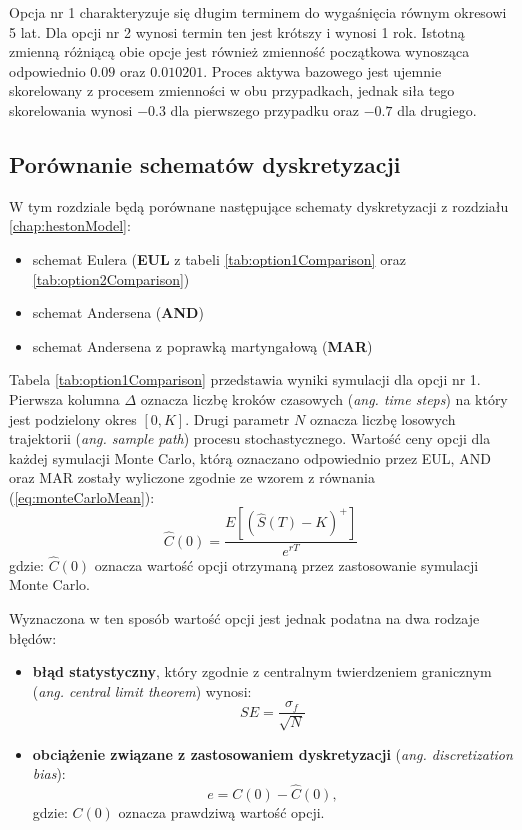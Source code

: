 \documentclass{pracamgr}
\begin{document}
Opcja nr 1 charakteryzuje się długim terminem do wygaśnięcia równym okresowi 5 lat. Dla opcji
nr 2 wynosi termin ten jest krótszy i wynosi 1 rok. Istotną 
zmienną różniącą obie opcje jest również zmienność początkowa 
wynosząca odpowiednio $0.09$ oraz $0.010201$. Proces aktywa bazowego jest ujemnie skorelowany
z procesem zmienności w obu przypadkach, jednak siła tego skorelowania wynosi $-0.3$ dla 
pierwszego przypadku oraz $-0.7$ dla drugiego.

\subsection{Porównanie schematów dyskretyzacji}
\label{sub:simulationNumericResult}
W tym rozdziale będą porównane następujące schematy dyskretyzacji z rozdziału \ref{chap:hestonModel}:
\begin{itemize}
  \item schemat Eulera (\textbf{EUL} z tabeli \ref{tab:option1Comparison} oraz \ref{tab:option2Comparison})
  \item schemat Andersena (\textbf{AND})
  \item schemat Andersena z poprawką martyngałową (\textbf{MAR})
\end{itemize}
Tabela \ref{tab:option1Comparison} przedstawia wyniki symulacji 
dla opcji nr 1. Pierwsza kolumna $\Delta$ oznacza
liczbę kroków czasowych (\textit{ang. time steps}) na który 
jest podzielony okres $[0, K]$. Drugi parametr $N$ oznacza liczbę
losowych trajektorii (\textit{ang. sample path}) procesu stochastycznego. 
Wartość ceny opcji dla każdej symulacji Monte Carlo, 
którą oznaczano odpowiednio przez EUL, AND oraz MAR 
zostały wyliczone zgodnie ze wzorem z równania (\ref{eq:monteCarloMean}):
\begin{equation}
  \hat{C}(0) = \frac{E \left[ (\hat{S}(T) - K)^{+} \right]}{e^{rT}}
\end{equation}
gdzie: $\hat{C}(0)$ oznacza wartość opcji otrzymaną przez zastosowanie symulacji Monte Carlo.

Wyznaczona w ten sposób wartość opcji jest jednak podatna na dwa rodzaje błędów:
\begin{itemize}
  \item \textbf{błąd statystyczny}, który zgodnie z centralnym twierdzeniem granicznym 
    (\textit{ang. central limit theorem}) wynosi:
  \begin{equation}
    SE = \frac{\sigma_f}{\sqrt{N}}
  \end{equation}

  \item \textbf{obciążenie związane z zastosowaniem dyskretyzacji} (\textit{ang. discretization bias}):
  \begin{equation}
    e = C(0) - \hat{C}(0),
  \end{equation}
  gdzie: $C(0)$ oznacza prawdziwą wartość opcji.
\end{itemize}
\end{document}
